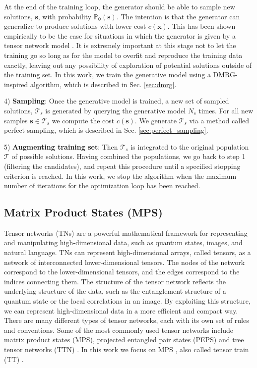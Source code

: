 At the end of the training loop, the generator should be able to sample new solutions, $\mathbf{s}$, with probability $\mathbb{P}_{\boldsymbol{\theta}}(\mathbf{s})$. The intention is that the generator can generalize to produce solutions with lower cost $c(\mathbf{x})$. This has been shown empirically to be the case for situations in which the generator is given by a tensor network model \cite{Alcazar2024,banner2023quantuminspiredoptimizationindustrial}. It is extremely important at this stage not to let the training go so long as for the model to overfit and reproduce the training data exactly, leaving out any possibility of exploration of potential solutions outside of the training set. 
In this work, we train the generative model using a DMRG-inspired algorithm, which is described in Sec. \ref{sec:dmrg}.

4) \textbf{Sampling}: Once the generative model is trained, a new set of sampled solutions, $\mathcal{T}_s$ is generated by querying the generative model $N_s$ times. For all new samples $\mathbf{s}\in \mathcal{T}_s$ we compute the cost $c(\mathbf{s})$. We generate $\mathcal{T}_s$ via a method called perfect sampling, which is described in Sec. \ref{sec:perfect_sampling}. 
 
5) \textbf{Augmenting training set}: Then $\mathcal{T}_s$ is integrated to the original population $\mathcal T$ of possible solutions. Having combined the populations, we go back to step 1 (filtering the candidates), and repeat this procedure until a specified stopping criterion is reached. 
In this work, we stop the algorithm when the maximum number of iterations for the optimization loop has been reached.


\subsection{Matrix Product States (MPS)}\label{sec:mps}
    Tensor networks (TNs) are a powerful mathematical framework for representing and manipulating high-dimensional data, such as quantum states, images, and natural language. TNs can represent high-dimensional arrays, called tensors, as a network of interconnected lower-dimensional tensors. The nodes of the network correspond to the lower-dimensional tensors, and the edges correspond to the indices connecting them. The structure of the tensor network reflects the underlying structure of the data, such as the entanglement structure of a quantum state or the local correlations in an image. By exploiting this structure, we can represent high-dimensional data in a more efficient and compact way. There are many different types of tensor networks, each with its own set of rules and conventions. 
    Some of the most commonly used tensor networks include matrix product states (MPS), projected entangled pair states (PEPS) \cite{verstraete2004} and tree tensor networks (TTN) \cite{PhysRevA.74.022320}. 
    In this work we focus on MPS \cite{ORUS2014117}, also called tensor train (TT) \cite{Oseledets_2011}. 
    

